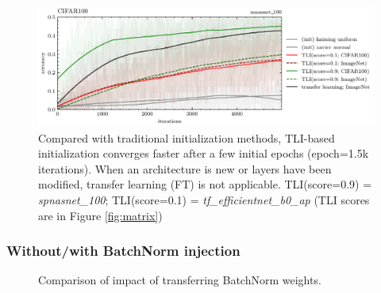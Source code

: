 \documentclass{article} %
\begin{document}
\begin{figure}[h]
\begin{center}
\center\includegraphics[width=\linewidth]{figures/v1_CIFAR100__acc_train}
\end{center}
\caption{
Compared with traditional initialization methods, TLI-based initialization converges faster after a few initial epochs (epoch=1.5k iterations).
%
When an architecture is new or layers have been modified, transfer learning (FT) is not applicable.
%
%
TLI(score=0.9) = \textit{spnasnet\_100};
TLI(score=0.1) = \textit{tf\_efficientnet\_b0\_ap}
(TLI scores are in Figure \ref{fig:matrix})
}
\label{fig:cifar100}
\end{figure}

\subsubsection{Without/with BatchNorm injection}

\begin{figure}[h]
	\begin{center}
	\end{center}
	\caption{Comparison of impact of transferring BatchNorm weights.}
	\label{fig:batchnorm}
\end{figure}
\end{document}
